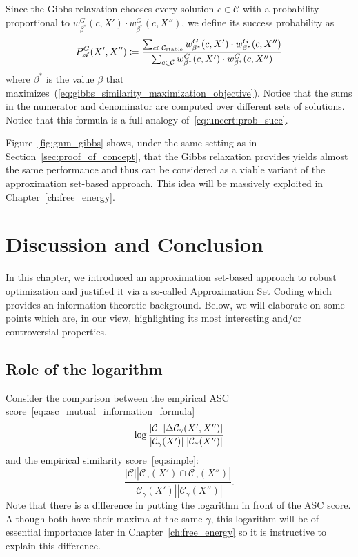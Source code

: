 Since the Gibbs relaxation chooses every solution $c \in \mathcal{C}$ with a probability
proportional to $w^G_{\beta^*}(c, X')\cdot w^G_{\beta^*}(c, X'')$, we define its
success probability as
\begin{equation}
  P_\mathscr{A}^G(X',X'')
    \coloneqq \frac{\sum_{c \in \mathcal{C}_\text{stable}} w^G_{\beta^*}(c, X')\cdot w^G_{\beta^*}(c, X'')}
      {\sum_{c \in \mathcal{C}} w^G_{\beta^*}(c, X')\cdot w^G_{\beta^*}(c, X'')}
\end{equation}
where $\beta^*$ is the value $\beta$ that
maximizes~(\ref{eq:gibbs_similarity_maximization_objective}). Notice that the
sums in the numerator and denominator are computed over different sets of
solutions. Notice that this formula is a full analogy
of~\eqref{eq:uncert:prob_succ}.

Figure~\ref{fig:gnm_gibbs} shows, under the same setting as in
Section~\ref{sec:proof_of_concept}, that the Gibbs relaxation provides yields
almost the same performance and thus can be considered as a viable variant
of the approximation set-based approach. This idea will be massively exploited 
in Chapter~\ref{ch:free_energy}.

\section{Discussion and Conclusion}
\label{sec:gen_appch_conclusion}

In this chapter, we introduced an approximation set-based approach to robust
optimization and justified it via a so-called Approximation Set Coding which
provides an information-theoretic background. Below, we will elaborate on some
points which are, in our view, highlighting its most interesting and/or
controversial properties.

\subsection*{Role of the logarithm}

Consider the comparison between the empirical ASC score~\eqref{eq:asc_mutual_information_formula}
\begin{equation*}
  \log 
    \frac{|\mathbb{\C}| \; |\Delta \mathcal{C}_\gamma(X', X'')|}%
      {|\mathcal{C}_\gamma(X')| \; |\mathcal{C}_\gamma(X'')|}
\end{equation*}
and the empirical similarity score~\eqref{eq:simple}:
\begin{equation*}
  \frac{|\mathcal{C}||{\mathcal{C}_\gamma}(X') \cap {\mathcal{C}_\gamma}(X'')|}
    {|{\mathcal{C}_\gamma}(X')||{\mathcal{C}_\gamma}(X'')|}.
\end{equation*}
Note that there is a difference in putting the logarithm in front of the 
ASC score. Although both have their maxima at the same $\gamma$, this logarithm
will be of essential importance later in Chapter~\ref{ch:free_energy} so
it is instructive to explain this difference.

